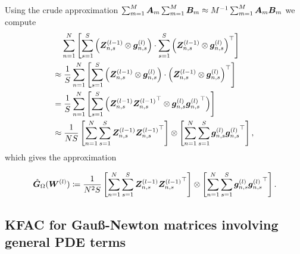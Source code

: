 Using the crude approximation $\sum_{m=1}^M {\bm{A}}_m\sum_{m=1}^M {\bm{B}}_m \approx M^{-1}\sum_{m=1}^M {\bm{A}}_m {\bm{B}}_m$ we compute 
\begin{align*}
    & \sum_{n=1}^N
    \left[\sum_{s=1}^S \left( {\bm{Z}}^{(l-1)}_{n,s}\otimes {\bm{g}}_{n,s}^{(l)} \right)
    \cdot
    \sum_{s=1}^S \left( {\bm{Z}}
    ^{(l-1)}_{n,s}\otimes {\bm{g}}_{n,s}^{(l)} \right)^\top\right]
    \\ \approx & \;
    \frac{1}{S}\sum_{n=1}^N
    \left[\sum_{s=1}^S \left( {\bm{Z}}^{(l-1)}_{n,s}\otimes {\bm{g}}_{n,s}^{(l)} \right)
    \cdot
    \left( {\bm{Z}}
    ^{(l-1)}_{n,s}\otimes {\bm{g}}_{n,s}^{(l)} \right)^\top\right]
    \\ = & \;
    \frac{1}{S}\sum_{n=1}^N
    \left[\sum_{s=1}^S \left( {\bm{Z}}^{(l-1)}_{n,s}{{\bm{Z}}
    ^{(l-1)}_{n,s}}^\top\otimes {\bm{g}}_{n,s}^{(l)}{{\bm{g}}_{n,s}^{(l)}}^\top \right)
    \right]
    \\ \approx & \;
    \frac{1}{NS}\left[\sum_{n=1}^N \sum_{s=1}^S {\bm{Z}}^{(l-1)}_{n,s}{{\bm{Z}}^{(l-1)}_{n,s}}^\top \right]
    \otimes
    \left[\sum_{n=1}^N\sum_{s=1}^S {\bm{g}}^{(l)}_{n,s}{{\bm{g}}^{(l)}_{n,s}}^\top \right],
\end{align*}
which gives the approximation 
\begin{tcolorbox}[colframe=kfac, title={KFAC for Gauß-Newton with the Laplace operator},bottom=0mm,top=0mm,middle=0mm]
\begin{align*}\label{eq:KFAC-PINN}
    \hat{\mG}_\Omega%
    (\mW^{(l)})
    \coloneqq \frac{1}{N^2 S}
    \left[\sum_{n=1}^N \sum_{s=1}^S \mZ^{(l-1)}_{n,s}{\mZ^{(l-1)}_{n,s}}^\top \right]
    \otimes
    \left[\sum_{n=1}^N\sum_{s=1}^S \vg^{(l)}_{n,s}{\vg^{(l)}_{n,s}}^\top \right].
\end{align*}
\end{tcolorbox}

\subsection{KFAC for Gauß-Newton matrices involving general PDE terms}

